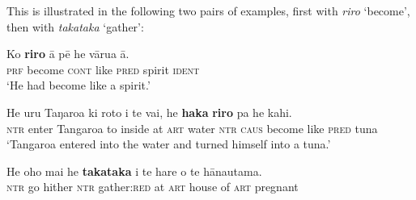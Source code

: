 
This is illustrated in the following two pairs of examples, first with \textit{riro} ‘become’, then with \textit{takataka} ‘gather’:

\ea\label{ex:8.240}
\gll Ko \textbf{riro} {\ꞌ}ā pē he vārua {\ꞌ}ā. \\
\textsc{prf} become \textsc{cont} like \textsc{pred} spirit \textsc{ident} \\

\glt 
‘He had become like a spirit.’ \textstyleExampleref{[R310.268]} 
\z

\ea\label{ex:8.241}
\gll He uru Taŋaroa ki roto i te vai, he \textbf{haka} \textbf{riro} pa he kahi. \\
\textsc{ntr} enter Tangaroa to inside at \textsc{art} water \textsc{ntr} \textsc{caus} become like \textsc{pred} tuna \\

\glt 
‘Tangaroa entered into the water and turned himself into a tuna.’ \textstyleExampleref{[Fel-046.020]}
\z

\ea\label{ex:8.242}
\gll He oho mai he \textbf{takataka} {\ꞌ}i te hare o te hānautama. \\
\textsc{ntr} go hither \textsc{ntr} gather:\textsc{red} at \textsc{art} house of \textsc{art} pregnant \\

